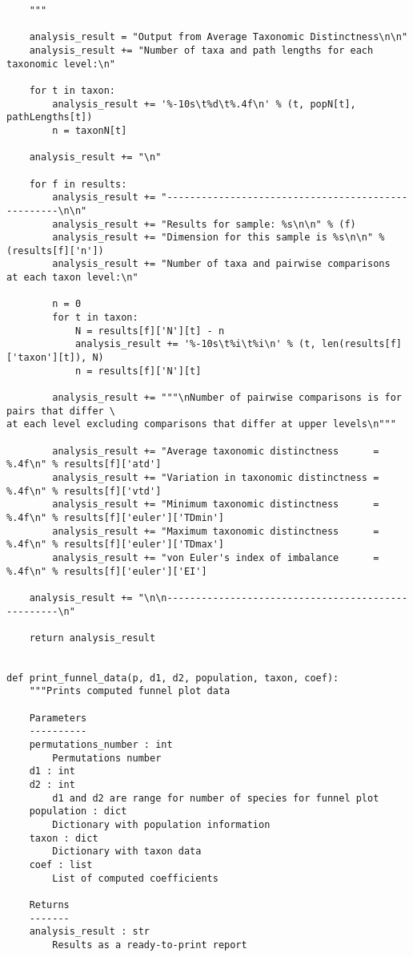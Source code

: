 \documentclass[a4paper,11pt]{article}
\begin{document}
\begin{lstlisting}
    """

    analysis_result = "Output from Average Taxonomic Distinctness\n\n"
    analysis_result += "Number of taxa and path lengths for each taxonomic level:\n"

    for t in taxon:
        analysis_result += '%-10s\t%d\t%.4f\n' % (t, popN[t], pathLengths[t])
        n = taxonN[t]

    analysis_result += "\n"

    for f in results:
        analysis_result += "---------------------------------------------------\n\n"
        analysis_result += "Results for sample: %s\n\n" % (f)
        analysis_result += "Dimension for this sample is %s\n\n" % (results[f]['n'])
        analysis_result += "Number of taxa and pairwise comparisons  at each taxon level:\n"

        n = 0
        for t in taxon:
            N = results[f]['N'][t] - n
            analysis_result += '%-10s\t%i\t%i\n' % (t, len(results[f]['taxon'][t]), N)
            n = results[f]['N'][t]

        analysis_result += """\nNumber of pairwise comparisons is for pairs that differ \
at each level excluding comparisons that differ at upper levels\n"""

        analysis_result += "Average taxonomic distinctness      = %.4f\n" % results[f]['atd']
        analysis_result += "Variation in taxonomic distinctness = %.4f\n" % results[f]['vtd']
        analysis_result += "Minimum taxonomic distinctness      = %.4f\n" % results[f]['euler']['TDmin']
        analysis_result += "Maximum taxonomic distinctness      = %.4f\n" % results[f]['euler']['TDmax']
        analysis_result += "von Euler's index of imbalance      = %.4f\n" % results[f]['euler']['EI']

    analysis_result += "\n\n---------------------------------------------------\n"

    return analysis_result


def print_funnel_data(p, d1, d2, population, taxon, coef):
    """Prints computed funnel plot data

    Parameters
    ----------
    permutations_number : int
        Permutations number
    d1 : int
    d2 : int
        d1 and d2 are range for number of species for funnel plot
    population : dict
        Dictionary with population information
    taxon : dict
        Dictionary with taxon data
    coef : list
        List of computed coefficients

    Returns
    -------
    analysis_result : str
        Results as a ready-to-print report


\end{lstlisting}
\end{document}
